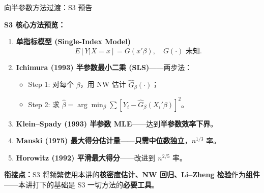 \documentclass[aspectratio=169, 10pt]{beamer}
\begin{document}
\begin{frame}{向半参数方法过渡：S3 预告}

  \begin{highlightbox}
    \textbf{S3 核心方法预览：}
    \begin{enumerate}
      \item \textbf{单指标模型 (Single-Index Model)}
        \[
          E[Y|X=x] = G(x'\beta),\quad G(\cdot) \text{ 未知}.
        \]
      \item \textbf{Ichimura (1993) 半参数最小二乘 (SLS)}——两步法：
        \begin{itemize}
          \item Step 1: 对每个 $\beta$，用 NW 估计 $\hat G_\beta(\cdot)$；
          \item Step 2: 求 $\hat\beta = \arg\min_\beta \sum [Y_i - \hat G_\beta(X_i'\beta)]^2$。
        \end{itemize}
      \item \textbf{Klein--Spady (1993) 半参数 MLE}——达到\textbf{半参数效率下界}。
      \item \textbf{Manski (1975) 最大得分估计量}——\textbf{只需中位数独立}，$n^{1/3}$ 率。
      \item \textbf{Horowitz (1992) 平滑最大得分}——改进到 $n^{2/5}$ 率。
    \end{enumerate}
  \end{highlightbox}


  \begin{keybox}
    \textbf{衔接点：}S3 将频繁使用本讲的\textbf{核密度估计、NW 回归、Li--Zheng 检验}作为\textbf{组件}——本讲打下的基础是 S3 一切方法的\textbf{必要工具}。
  \end{keybox}

\end{frame}
\end{document}
